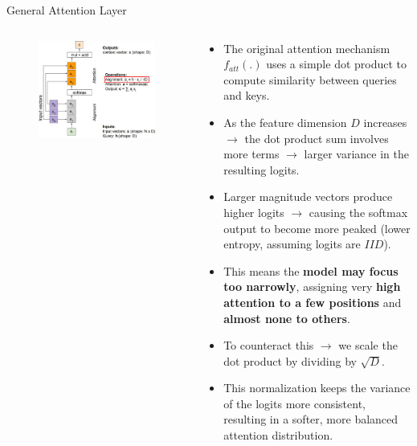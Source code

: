 \begin{frame}[allowframebreaks]{General Attention Layer}
    \begin{columns}
    \begin{column}{0.5\textwidth}
        \begin{figure}
            \flushleft
            \includegraphics[width=\linewidth,height=\textheight,keepaspectratio]{images/transformers/slide_36_1_img.jpg}
        \end{figure}
    \end{column}
    \begin{column}{0.65\textwidth}
        \begin{itemize}
            \item The original attention mechanism $f_{att}(.)$ uses a simple dot product to compute similarity between queries and keys.
            \item As the feature dimension $D$ increases $\rightarrow$ the dot product sum involves more terms $\rightarrow$ larger variance in the resulting logits.
            \item Larger magnitude vectors produce higher logits $\rightarrow$ causing the softmax output to become more peaked (lower entropy, assuming logits are $IID$).
            \item This means the \textbf{model may focus too narrowly}, assigning very \textbf{high attention to a few positions} and \textbf{almost none to others}.
            \item To counteract this $\rightarrow$ we scale the dot product by dividing by $\sqrt{D}$.
            \item This normalization keeps the variance of the logits more consistent, resulting in a softer, more balanced attention distribution.
        \end{itemize}
    \end{column}
    \end{columns}


\end{frame}
